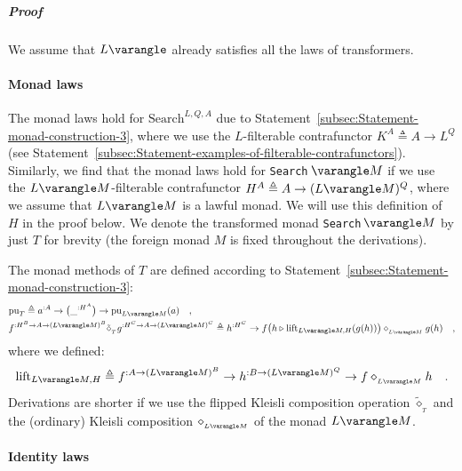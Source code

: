 \subparagraph{Proof}

We assume that $L\varangle$ already satisfies all the laws of transformers.

\paragraph{Monad laws}

The monad laws hold for $\text{Search}^{L,Q,A}$ due to Statement~\ref{subsec:Statement-monad-construction-3},
where we use the $L$-filterable contrafunctor $K^{A}\triangleq A\rightarrow L^{Q}$
(see Statement~\ref{subsec:Statement-examples-of-filterable-contrafunctors}).
Similarly, we find that the monad laws hold for \lstinline!Search!$\,\varangle M$
if we use the $L\varangle M$-filterable contrafunctor $H^{A}\triangleq A\rightarrow(L\varangle M)^{Q}$,
where we assume that $L\varangle M$ is a lawful monad. We will use
this definition of $H$ in the proof below. We denote the transformed
monad \lstinline!Search!$\,\varangle M$ by just $T$ for brevity
(the foreign monad $M$ is fixed throughout the derivations). 

The monad methods of $T$ are defined according to Statement~\ref{subsec:Statement-monad-construction-3}:
\begin{align*}
 & \text{pu}_{T}\triangleq a^{:A}\rightarrow\big(\_^{:H^{A}}\big)\rightarrow\text{pu}_{L\varangle M}(a)\quad,\\
 & f^{:H^{B}\rightarrow A\rightarrow(L\varangle M)^{B}}\tilde{\diamond}_{_{T}}g^{:H^{C}\rightarrow A\rightarrow(L\varangle M)^{C}}\triangleq h^{:H^{C}}\rightarrow f\big(h\triangleright\text{lift}_{L\varangle M,H}(g(h))\big)\diamond_{_{L\varangle M}}g(h)\quad,
\end{align*}
where we defined:
\[
\text{lift}_{L\varangle M,H}\triangleq f^{:A\rightarrow(L\varangle M)^{B}}\rightarrow h^{:B\rightarrow(L\varangle M)^{Q}}\rightarrow f\diamond_{_{L\varangle M}}h\quad.
\]
Derivations are shorter if we use the flipped Kleisli composition
operation $\tilde{\diamond}_{_{T}}$ and the (ordinary) Kleisli composition
$\diamond_{_{L\varangle M}}$ of the monad $L\varangle M$.

\paragraph{Identity laws}

